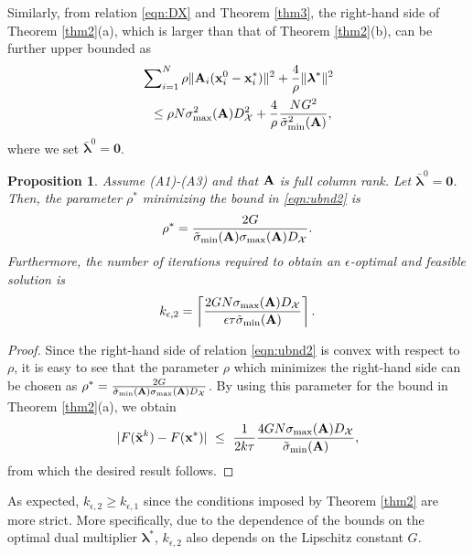 \documentclass[doublecolumn]{IEEEtran}
\newtheorem{prop}{\bf \noindent Proposition}
\def\0b{\mathbf{0}}
\begin{document}
Similarly, from relation \eqref{eqn:DX} and Theorem \ref{thm3}, the right-hand side of Theorem \ref{thm2}(a), which is larger than that of Theorem \ref{thm2}(b), can be further upper bounded as
\begin{align}\label{eqn:ubnd2}
&\sum\nolimits_{i=1}^N {\rho}\|{ {\bf A} }_i({ {\bf x} }_i^0-{ {\bf x} }_i^*)\|^2 +\frac{4}{\rho}\|{\boldsymbol{\lambda}}^*\|^2\\
&~~\le \rho N\sigma_{\max}^2({ {\bf A} })D_{ \mathcal{X} }^2 + \frac{4}{\rho}\frac{NG^2}{\tilde\sigma_{\min}^2({ {\bf A} })},\nonumber
\end{align}
where we set $\bar {\boldsymbol{\lambda}}^0 = \0b$.

\begin{prop}
Assume (A1)-(A3) and that ${ {\bf A} }$ is full column rank. Let $\bar {\boldsymbol{\lambda}}^0 = \0b$.
Then, the parameter $\rho^*$ minimizing the bound in \eqref{eqn:ubnd2} is
\begin{align*}
\rho^* = \frac{2G}{\tilde\sigma_{\min}({ {\bf A} })\sigma_{\max}({ {\bf A} })D_{ \mathcal{X} }}.
\end{align*}
Furthermore, the number of iterations required to obtain an $\epsilon$-optimal and feasible solution is
\begin{align*}
k_{\epsilon,2} =\left\lceil  \frac{2GN\sigma_{\max}({ {\bf A} })D_{ \mathcal{X} }}{\epsilon\tau\tilde\sigma_{\min}({ {\bf A} })}
\right\rceil.
\end{align*}
\end{prop}
\begin{proof}
Since the right-hand side of relation \eqref{eqn:ubnd2} is convex with respect to $\rho$,
it is easy to see that the parameter $\rho$ which minimizes the right-hand side can be chosen as
$\rho^* = \frac{2G}{\tilde\sigma_{\min}({ {\bf A} })\sigma_{\max}({ {\bf A} })D_{ \mathcal{X} }}$.
By using this parameter for the bound in Theorem \ref{thm2}(a), we obtain
\begin{align*}
|F({ \tilde{\bf x} }^k) -  F({ {\bf x} }^*)| ~\leq~ \frac{1}{2k\tau} \frac{4GN\sigma_{\max}({ {\bf A} })D_{ \mathcal{X} }}{\tilde\sigma_{\min}({ {\bf A} })},
\end{align*}
from which the desired result follows.
\end{proof}
\vspace{3pt}

As expected, $k_{\epsilon,2} \ge k_{\epsilon,1}$ since the conditions imposed by Theorem \ref{thm2} are more strict.
More specifically, due to the dependence of the bounds on the optimal dual multiplier ${\boldsymbol{\lambda}}^*$, $k_{\epsilon,2}$ also depends on the Lipschitz constant $G$.
\end{document}

